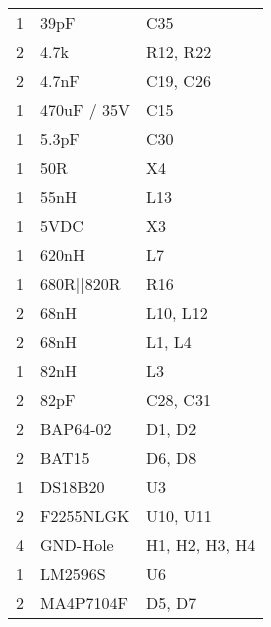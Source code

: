 \begin{longtable}{l|l|l}
	1   & 39pF          & C35                                                          \\
	2   & 4.7k          & R12, R22                                                     \\
	2   & 4.7nF         & C19, C26                                                     \\
	1   & 470uF / 35V   & C15                                                          \\
	1   & 5.3pF         & C30                                                          \\
	1   & 50R           & X4                                                           \\
	1   & 55nH          & L13                                                          \\
	1   & 5VDC          & X3                                                           \\
	1   & 620nH         & L7                                                           \\
	1   & 680R||820R    & R16                                                          \\
	2   & 68nH          & L10, L12                                                     \\
	2   & 68nH          & L1, L4                                                       \\
	1   & 82nH          & L3                                                           \\
	2   & 82pF          & C28, C31                                                     \\
	2   & BAP64-02      & D1, D2                                                       \\
	2   & BAT15         & D6, D8                                                       \\
	1   & DS18B20       & U3                                                           \\
	2   & F2255NLGK     & U10, U11                                                     \\
	4   & GND-Hole      & H1, H2, H3, H4                                               \\
	1   & LM2596S       & U6                                                           \\
	2   & MA4P7104F     & D5, D7                                                       \\

\end{longtable}
